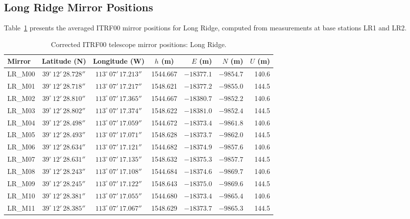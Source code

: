 \documentclass[11pt,letterpaper]{article}
\newcommand{\degree}{^\circ}
\begin{document}
\subsection{Long Ridge Mirror Positions}

Table~\ref{tab:lr_mirrors} presents the averaged ITRF00 mirror positions for Long Ridge, computed from measurements at base stations LR1 and LR2.

\begin{table}[H]
\centering
\caption{Corrected ITRF00 telescope mirror positions: Long Ridge.}
\label{tab:lr_mirrors}
\smallskip
\footnotesize
\begin{tabular}{@{}lcccrrr@{}}
\toprule
{Mirror} & {Latitude (N)} & {Longitude (W)} & {$h$ (m)} & {$E$ (m)} & {$N$ (m)} & {$U$ (m)} \\
\midrule
LR\_M00 & $39\degree\,12'\,28.728''$ & $113\degree\,07'\,17.213''$ & 1544.667 & $-18377.1$ & $-9854.7$ & 140.6 \\
LR\_M01 & $39\degree\,12'\,28.718''$ & $113\degree\,07'\,17.217''$ & 1548.621 & $-18377.2$ & $-9855.0$ & 144.5 \\
LR\_M02 & $39\degree\,12'\,28.810''$ & $113\degree\,07'\,17.365''$ & 1544.667 & $-18380.7$ & $-9852.2$ & 140.6 \\
LR\_M03 & $39\degree\,12'\,28.802''$ & $113\degree\,07'\,17.374''$ & 1548.622 & $-18381.0$ & $-9852.4$ & 144.5 \\
LR\_M04 & $39\degree\,12'\,28.498''$ & $113\degree\,07'\,17.059''$ & 1544.672 & $-18373.4$ & $-9861.8$ & 140.6 \\
LR\_M05 & $39\degree\,12'\,28.493''$ & $113\degree\,07'\,17.071''$ & 1548.628 & $-18373.7$ & $-9862.0$ & 144.5 \\
LR\_M06 & $39\degree\,12'\,28.634''$ & $113\degree\,07'\,17.121''$ & 1544.682 & $-18374.9$ & $-9857.6$ & 140.6 \\
LR\_M07 & $39\degree\,12'\,28.631''$ & $113\degree\,07'\,17.135''$ & 1548.632 & $-18375.3$ & $-9857.7$ & 144.5 \\
LR\_M08 & $39\degree\,12'\,28.243''$ & $113\degree\,07'\,17.108''$ & 1544.684 & $-18374.6$ & $-9869.7$ & 140.6 \\
LR\_M09 & $39\degree\,12'\,28.245''$ & $113\degree\,07'\,17.122''$ & 1548.643 & $-18375.0$ & $-9869.6$ & 144.5 \\
LR\_M10 & $39\degree\,12'\,28.381''$ & $113\degree\,07'\,17.055''$ & 1544.680 & $-18373.4$ & $-9865.4$ & 140.6 \\
LR\_M11 & $39\degree\,12'\,28.385''$ & $113\degree\,07'\,17.067''$ & 1548.629 & $-18373.7$ & $-9865.3$ & 144.5 \\
\bottomrule
\end{tabular}
\end{table}
\end{document}
